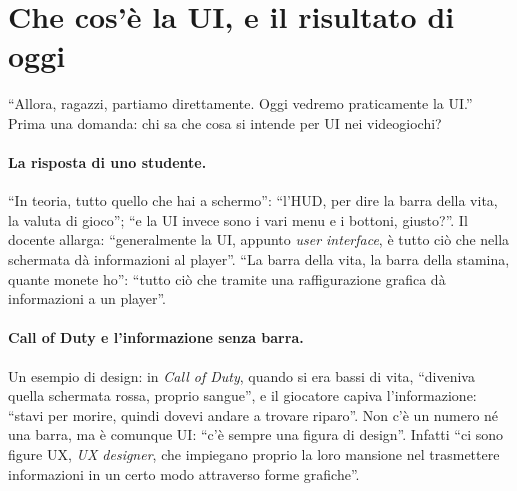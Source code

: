 \section{Che cos'è la UI, e il risultato di oggi}
\label{ue11:sec:ui}

``Allora, ragazzi, partiamo direttamente. Oggi vedremo praticamente la UI.'' Prima una
domanda: chi sa che cosa si intende per UI nei videogiochi?

\paragraph{La risposta di uno studente.} ``In teoria, tutto quello che hai a schermo'':
``l'HUD, per dire la barra della vita, la valuta di gioco''; ``e la UI invece sono i vari
menu e i bottoni, giusto?''. Il docente allarga: ``generalmente la UI, appunto
\emph{user interface}, è tutto ciò che nella schermata dà informazioni al player''. ``La
barra della vita, la barra della stamina, quante monete ho'': ``tutto ciò che tramite una
raffigurazione grafica dà informazioni a un player''.

\paragraph{Call of Duty e l'informazione senza barra.} Un esempio di design: in
\emph{Call of Duty}, quando si era bassi di vita, ``diveniva quella schermata rossa,
proprio sangue'', e il giocatore capiva l'informazione: ``stavi per morire, quindi
dovevi andare a trovare riparo''. Non c'è un numero né una barra, ma è comunque UI: ``c'è
sempre una figura di design''. Infatti ``ci sono figure UX, \emph{UX designer}, che
impiegano proprio la loro mansione nel trasmettere informazioni in un certo modo
attraverso forme grafiche''.

